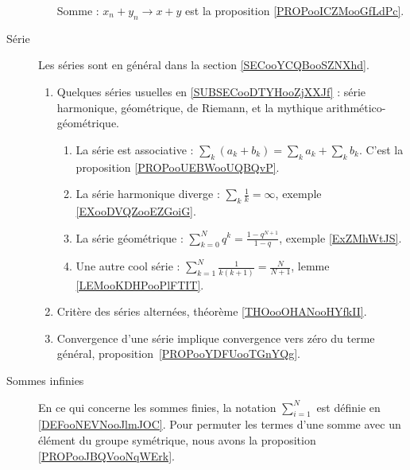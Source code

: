 \begin{description}
\begin{enumerate}
                Somme : \( x_n+y_n\to x+y\) est la proposition \ref{PROPooICZMooGfLdPc}.
        \end{enumerate}
    \item[Série] 
        Les séries sont en général dans la section \ref{SECooYCQBooSZNXhd}.
        \begin{enumerate}
    \item
        Quelques séries usuelles en \ref{SUBSECooDTYHooZjXXJf} : série harmonique, géométrique, de Riemann, et la mythique arithmético-géométrique.
        \begin{enumerate}
            \item
                La série est associative : \( \sum_k(a_k+b_k)=\sum_ka_k+\sum_kb_k\). C'est la proposition \ref{PROPooUEBWooUQBQvP}.
            \item
                La série harmonique diverge : \( \sum_k\frac{1}{ k }=\infty\), exemple \ref{EXooDVQZooEZGoiG}.
            \item
                La série géométrique : \( \sum_{k=0}^Nq^k=\frac{ 1-q^{N+1} }{ 1-q }\), exemple \ref{ExZMhWtJS}.
            \item
                Une autre cool série : \( \sum_{k=1}^N\frac{ 1 }{ k(k+1) }=\frac{ N }{ N+1 }\), lemme \ref{LEMooKDHPooPlFTIT}.
        \end{enumerate}
    \item
        Critère des séries alternées, théorème \ref{THOooOHANooHYfkII}.
    \item
        Convergence d'une série implique convergence vers zéro du terme général, proposition~\ref{PROPooYDFUooTGnYQg}.
        \end{enumerate}

    \item[Sommes infinies]
        En ce qui concerne les sommes finies, la notation \( \sum_{i=1}^N\) est définie en \ref{DEFooNEVNooJlmJOC}. Pour permuter les termes d'une somme avec un élément du groupe symétrique, nous avons la proposition \ref{PROPooJBQVooNqWErk}.


\end{description}
